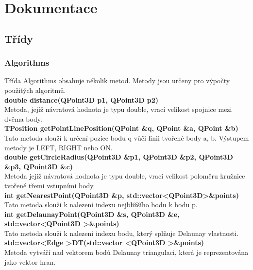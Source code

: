 \documentclass[a4paper, 12pt]{article}
\begin{document}
\clearpage



\section{Dokumentace}
\subsection{Třídy}
\subsubsection{Algorithms}
Třída Algorithms obsahuje několik metod. Metody jsou určeny pro výpočty použitých algoritmů.
\\

\textbf{double distance(QPoint3D p1, QPoint3D p2)}\\
Metoda, jejíž návratová hodnota je typu double, vrací velikost spojnice mezi dvěma body.
\\

\textbf{TPosition getPointLinePosition(QPoint \&q, QPoint \&a, QPoint \&b)}\\
Tato metoda slouží k určení pozice bodu q vůči linii tvořené body a, b. Výstupem metody je LEFT, RIGHT nebo ON.\\

\textbf{double getCircleRadius(QPoint3D \&p1, QPoint3D \&p2, QPoint3D \&p3, QPoint3D \&c)}\\
Metoda jejíž návratová hodnota je typu double, vrací velikost poloměru kružnice tvořené třemi vstupními body.\\

\textbf{int getNearestPoint(QPoint3D \&p, std::vector\textless QPoint3D\textgreater \&points)}\\
Tato metoda slouží k nalezení indexu nejbližšího bodu k bodu p.\\

\textbf{int getDelaunayPoint(QPoint3D \&s, QPoint3D \&e, std::vector\textless QPoint3D \textgreater \&points)}\\
Tato metoda slouží k nalezení indexu bodu, který splňuje Delaunay vlastnosti.\\

\textbf{std::vector\textless Edge \textgreater DT(std::vector \textless QPoint3D \textgreater \&points)}\\
Metoda vytváří nad vektorem bodů Delaunay triangulaci, která je reprezentována jako vektor hran.\\
\end{document}
